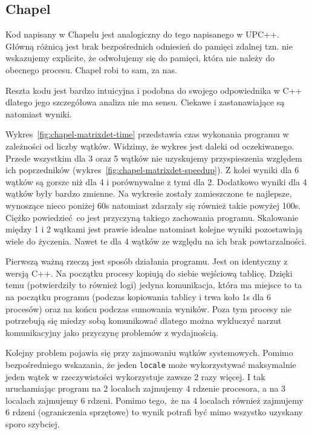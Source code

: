 \subsection{Chapel}

Kod napisany w Chapelu jest analogiczny do tego napisanego w UPC++.
Główną różnicą jest brak bezpośrednich odniesień do pamięci zdalnej tzn.
nie wskazujemy explicite, że odwołujemy się do pamięci, która nie należy
do obecnego procesu.
Chapel robi to sam, za nas.

Reszta kodu jest bardzo intuicyjna i podobna do swojego odpowiednika w C++ dlatego
jego szczegółowa analiza nie ma sensu.
Ciekawe i zastanawiające są natomiast wyniki.


Wykres~\ref{fig:chapel-matrixdet-time} przedstawia czas wykonania programu w zależności
od liczby wątków.
Widzimy, że wykres jest daleki od oczekiwanego.
Przede wszystkim dla 3 oraz 5 wątków nie uzyskujemy przyspieszenia względem ich poprzedników
(wykres~\ref{fig:chapel-matrixdet-speedup}).
Z kolei wyniki dla 6 wątków są gorsze niż dla 4 i porównywalne z tymi dla 2.
Dodatkowo wyniki dla 4 wątków były bardzo zmienne.
Na wykresie zostały zamieszczone te najlepsze, wynoszące nieco poniżej 60s natomiast
zdarzały się również takie powyżej 100s.
Ciężko powiedzieć co jest przyczyną takiego zachowania programu.
Skalowanie między 1 i 2 wątkami jest prawie idealne natomiast kolejne wyniki
pozostawiają wiele do życzenia.
Nawet te dla 4 wątków ze względu na ich brak powtarzalności.

Pierwszą ważną rzeczą jest sposób działania programu.
Jest on identyczny z wersją C++.
Na początku procesy kopiują do siebie wejściową tablicę.
Dzięki temu (potwierdziły to również logi) jedyna komunikacja, która ma miejsce
to ta na początku programu (podczas kopiowania tablicy i trwa koło 1s dla 6 procesów)
oraz na końcu podczas sumowania wyników.
Poza tym procesy nie potrzebują się miedzy sobą komunikować dlatego można wykluczyć
narzut komunikacyjny jako przyczynę problemów z wydajnością.

Kolejny problem pojawia się przy zajmowaniu wątków systemowych.
Pomimo bezpośredniego wskazania, że jeden \texttt{locale} może wykorzystywać maksymalnie
jeden wątek w rzeczywistości wykorzystuje zawsze 2 razy więcej.
I tak uruchamiając program na 2 localach zajmujemy 4 rdzenie procesora, a
na 3 localach zajmujemy 6 rdzeni.
Pomimo tego, że na 4 localach również zajmujemy 6 rdzeni (ograniczenia sprzętowe)
to wynik potrafi być mimo wszystko uzyskany sporo szybciej.

